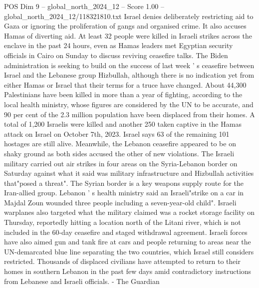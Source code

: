 \begin{textsample}{POS Dim 9 – global\_north\_2024\_12 – Score 1.00 – global\_north\_2024\_12/118321810.txt}
Israel denies deliberately restricting aid to Gaza or ignoring the proliferation of gangs and organised crime.
It also accuses Hamas of diverting aid.
At least 32 people were killed in Israeli strikes across the enclave in the past 24 hours, even as Hamas leaders met Egyptian security officials in Cairo on Sunday to discuss reviving ceasefire talks.
The Biden administration is seeking to build on the success of last week ' s ceasefire between Israel and the Lebanese group Hizbullah, although there is no indication yet from either Hamas or Israel that their terms for a truce have changed.
About 44,300 Palestinians have been killed in more than a year of fighting, according to the local health ministry, whose figures are considered by the UN to be accurate, and 90 per cent of the 2.3 million population have been displaced from their homes.
A total of 1,200 Israelis were killed and another 250 taken captive in the Hamas attack on Israel on October 7th, 2023.
Israel says 63 of the remaining 101 hostages are still alive.
Meanwhile, the Lebanon ceasefire appeared to be on shaky ground as both sides accused the other of new violations.
The Israeli military carried out air strikes in four areas on the Syria-Lebanon border on Saturday against what it said was military infrastructure and Hizbullah activities that"posed a threat".
The Syrian border is a key weapons supply route for the Iran-allied group.
Lebanon ' s health ministry said an Israeli"strike on a car in Majdal Zoun wounded three people including a seven-year-old child".
Israeli warplanes also targeted what the military claimed was a rocket storage facility on Thursday, reportedly hitting a location north of the Litani river, which is not included in the 60-day ceasefire and staged withdrawal agreement.
Israeli forces have also aimed gun and tank fire at cars and people returning to areas near the UN-demarcated blue line separating the two countries, which Israel still considers restricted.
Thousands of displaced civilians have attempted to return to their homes in southern Lebanon in the past few days amid contradictory instructions from Lebanese and Israeli officials. - The Guardian

\end{textsample}
